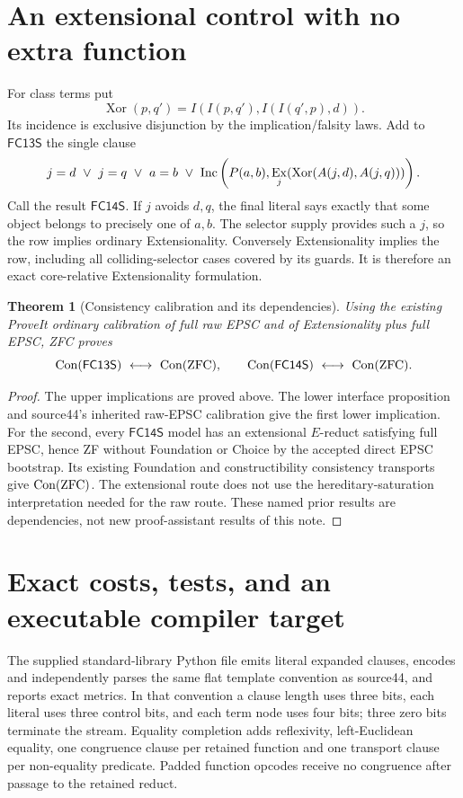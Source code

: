 \documentclass[11pt]{article}
\newtheorem{theorem}{Theorem}
\newcommand{\Inc}{\mathop{\rm Inc}}
\newcommand{\Con}{\mathop{\rm Con}}
\newcommand{\FC}{\ensuremath{\mathsf{FC13S}}}
\newcommand{\FCE}{\ensuremath{\mathsf{FC14S}}}
\newcommand{\Ex}[2]{\mathop{\rm Ex}_{#1}(#2)}
\begin{document}
\section{An extensional control with no extra function}

For class terms put
\[
 \operatorname{Xor}(p,q')=I(I(p,q'),I(I(q',p),d)).
\]
Its incidence is exclusive disjunction by the implication/falsity laws.
Add to $\FC$ the single clause
\[
 j=d\ \lor\ j=q\ \lor\ a=b\ \lor\
 \Inc\left(P(a,b),\Ex{j}{
 \operatorname{Xor}(A(j,d),A(j,q))}\right).
\]
Call the result $\FCE$.  If $j$ avoids $d,q$, the final literal says
exactly that some object belongs to precisely one of $a,b$.  The selector
supply provides such a $j$, so the row implies ordinary Extensionality.
Conversely Extensionality implies the row, including all colliding-selector
cases covered by its guards.  It is therefore an exact core-relative
Extensionality formulation.

\begin{theorem}[Consistency calibration and its dependencies]
Using the existing ProveIt ordinary calibration of full raw EPSC and of
Extensionality plus full EPSC, ZFC proves
\[
 \Con(\FC)\ \longleftrightarrow\ \Con(\mathrm{ZFC}),\qquad
 \Con(\FCE)\ \longleftrightarrow\ \Con(\mathrm{ZFC}).
\]
\end{theorem}
\begin{proof}
The upper implications are proved above.  The lower interface proposition
and source44's inherited raw-EPSC calibration give the first lower
implication.  For the second, every $\FCE$ model has an extensional
$E$-reduct satisfying full EPSC, hence ZF without Foundation or Choice by
the accepted direct EPSC bootstrap.  Its existing Foundation and
constructibility consistency transports give $\Con(\mathrm{ZFC})$.
The extensional route does not use the hereditary-saturation interpretation
needed for the raw route.  These named prior results are dependencies, not
new proof-assistant results of this note.
\end{proof}

\section{Exact costs, tests, and an executable compiler target}

The supplied standard-library Python file emits literal expanded clauses,
encodes and independently parses the same flat template convention as
source44, and reports exact metrics.  In that convention a clause length
uses three bits, each literal uses three control bits, and each term node
uses four bits; three zero bits terminate the stream.  Equality completion
adds reflexivity, left-Euclidean equality, one congruence clause per retained
function and one transport clause per non-equality predicate.  Padded
function opcodes receive no congruence after passage to the retained reduct.
\end{document}
